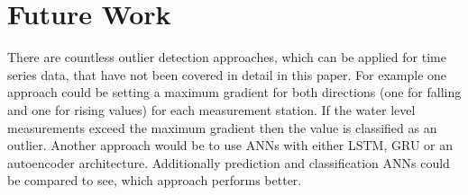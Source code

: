 \chapter{Future Work}
There are countless outlier detection approaches, which can be applied for time series data, that have not been covered in detail in this paper. For example one approach could be setting a maximum gradient for both directions (one for falling and one for rising values) for each measurement station. If the water level measurements exceed the maximum gradient then the value is classified as an outlier. Another approach would be to use \acp{ANN} with either \ac{LSTM}, \ac{GRU} or an autoencoder architecture. Additionally prediction and classification \acp{ANN} could be compared to see, which approach performs better. 
